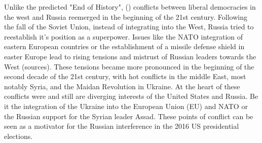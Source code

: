 \documentclass[12pt, authoryear]{elsarticle}
\begin{document}
Unlike the predicted "End of History", (\cite{fukuyama1989end}) conflicts between liberal democracies in the west and Russia reemerged in the beginning of the 21st century. Following the fall of the Soviet Union, instead of integrating into the West, Russia tried to reestablish it's position as a superpower. Issues like the NATO integration of eastern European countries or the establishment of a missile defense shield in easter Europe lead to rising tensions and mistrust of Russian leaders towards the West (sources). These tensions became more pronounced in the beginning of the second decade of the 21st century, with hot conflicts in the middle East, most notably Syria, and the Maidan Revolution in Ukraine. At the heart of these conflicts were and still are diverging interests of the United States and Russia. Be it the integration of the Ukraine into the European Union (EU) and NATO or the Russian support for the Syrian leader Assad. These points of conflict can be seen as a motivator for the Russian interference in the 2016 US presidential elections. 
\end{document}
